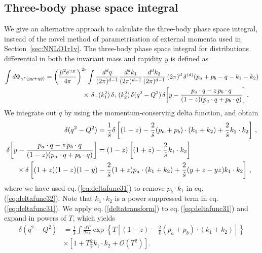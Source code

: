 \documentclass[11pt]{article}
\newcommand{\eps}{\epsilon}
\newcommand\eqn[1]     {eq.\,(\ref{#1})}
\begin{document}
\subsection{Three-body phase space integral}
\label{3PhaseSpace-DY}
%
We give an alternative approach to calculate the three-body phase space integral, instead of the novel method of parametrisation of external momenta used in Section~\ref{sec:NNLO1r1v}. The three-body phase space integral for distributions differential in both the invariant mass and rapidity $y$ is defined as
%
\begin{align}\label{eq:phaseDY3invmy}
    \int d \Phi_{\gamma^*(gg+q\bar q)} &= \bigg(\frac{\bar \mu^2 e^{\gamma_E}}{4\pi}\bigg)^{2\eps}\int \frac{d^dq}{(2\pi)^{d-1}} 
\frac{d^d k_1}{(2\pi)^{d-1}} \frac{d^d k_2}{(2\pi)^{d-1}}
\,(2\pi)^d\, \delta^{(d)}(p_a + p_b - q - k_1 - k_2) \nonumber \\
&\hspace{2.0cm}\times  \,\delta_+(k_1^2)\, \delta_+(k_2^2)  \, \delta(q^2 - Q^2)\, \delta\bigg[y - \frac{p_a \cdot q - z \, p_b \cdot q}{(1-z)
(p_a \cdot q + p_b \cdot q)} \bigg]\,.
\end{align}
We integrate out $q$ by using the momentum-conserving delta function, and obtain
%
\begin{align}
\delta(q^2 - Q^2) &= \frac{1}{\hat{s}}\delta\left[(1-z)-\frac{2}{\hat{s}}(p_a+p_b)\cdot (k_1+k_2)+\frac{2}{\hat{s}}k_1\cdot k_2 \right]\,, \label{eq:deltafunc31} \\
    \delta\bigg[y - \frac{p_a \cdot q - z \, p_b \cdot q}{(1-z) (p_a \cdot q + p_b \cdot q)} \bigg] 
    &= (1-z)\left[(1+z)-\frac{2}{\hat{s}}k_1\cdot k_2\right] \nonumber \\
    &\hspace{-4.0cm}\times\delta\left[(1+z)(1-z)(1-y)-\frac{2}{\hat{s}}(1+z)p_a\cdot(k_1+k_2)+\frac{2}{\hat{s}}(y+z-yz)k_1\cdot k_2\right]\,,\label{eq:deltafunc32}
\end{align}
%
where we have used \eqn{eq:deltafunc31} to remove $p_b\cdot k_1$ in \eqn{eq:deltafunc32}. Note that $k_1\cdot k_2$ is a power suppressed term in \eqn{eq:deltafunc31}. We apply \eqn{deltatransform} to \eqn{eq:deltafunc31} and expand in powers of $T$, which yields 
%
\begin{align}\label{eq:deltafuncexp1}
    \delta(q^2 - Q^2) &= \frac{1}{\hat{s}}\int \frac{dT}{2\pi i}\exp\left\{T\left[(1-z)-\frac{2}{\hat{s}}(p_a+p_b)\cdot (k_1+k_2)\right] \right\}\nonumber \\
    &\times\left[1+T\frac{2}{\hat{s}}k_1\cdot k_2+\mathcal{O}\left(T^2\right)\right].
\end{align}
\end{document}
